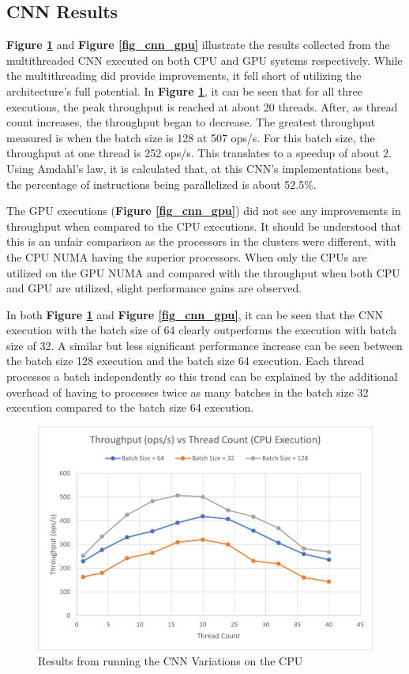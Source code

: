 \documentclass[journal]{IEEEtran}
\begin{document}
\subsection{CNN Results}
\textbf{Figure \ref{fig_cnn_cpu}} and \textbf{Figure \ref{fig_cnn_gpu}} illustrate the results collected from the multithreaded CNN executed on both CPU and GPU systems respectively. While the multithreading did provide improvements, it fell short of utilizing the architecture's full potential. In \textbf{Figure \ref{fig_cnn_cpu}}, it can be seen that for all three executions, the peak throughput is reached at about 20 threads. After, as thread count increases, the throughput began to decrease. The greatest throughput measured is when the batch size is 128 at 507 ops/s. For this batch size, the throughput at one thread is 252 ops/s. This translates to a speedup of about 2. Using Amdahl's law, it is calculated that, at this CNN's implementations best, the percentage of instructions being parallelized is about 52.5\%. 
\par
The GPU executions (\textbf{Figure \ref{fig_cnn_gpu}}) did not see any improvements in throughput when compared to the CPU executions. It should be understood that this is an unfair comparison as the processors in the clusters were different, with the CPU NUMA having the superior processors. When only the CPUs are utilized on the GPU NUMA and compared with the throughput when both CPU and GPU are utilized, slight performance gains are observed.
\par
In both \textbf{Figure \ref{fig_cnn_cpu}} and \textbf{Figure \ref{fig_cnn_gpu}}, it can be seen that the CNN execution with the batch size of 64 clearly outperforms the execution with batch size of 32. A similar but less significant performance increase can be seen between the batch size 128 execution and the batch size 64 execution. Each thread processes a batch independently so this trend can be explained by the additional overhead of having to processes twice as many batches in the batch size 32 execution compared to the batch size 64 execution.

\begin{figure}[!t]
\centering
\includegraphics[width=\linewidth]{CNN_CPU_Throughput.png}
\caption{Results from running the CNN Variations on the CPU}
\label{fig_cnn_cpu}
\end{figure}
\end{document}
